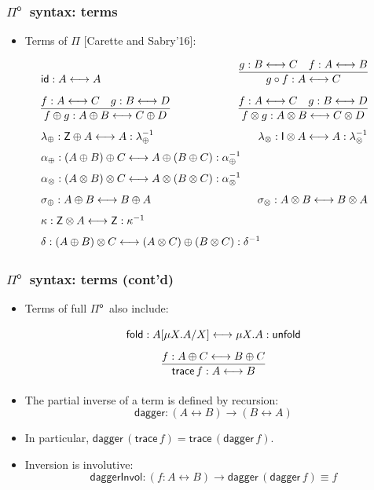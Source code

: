 \documentclass[12pt,t]{beamer}
\newcommand{\Pio}{\ensuremath{\mathsf{\Pi}^{\mathsf{o}}}}
\newcommand{\id}{\mathsf{id}}
\newcommand{\lr}{\longleftrightarrow}
\newcommand{\fold}{\mathsf{fold}}
\newcommand{\unfold}{\mathsf{unfold}}
\newcommand{\trace}{\ensuremath{\mathsf{trace}}}
\newcommand{\Z}{\mathsf{Z}}
\newcommand{\I}{\mathsf{I}}
\renewcommand{\dagger}{\mathsf{dagger}}
\begin{document}
\begin{frame}

  \frametitle{\Pio\ syntax: terms}
  \begin{itemize}
  \item Terms of $\Pi$ [Carette and Sabry'16]:

  \end{itemize}
  \small
  \[
  \arraycolsep=-10pt\def\arraystretch{1.6}
  \begin{array}{lr}%
    \id : A \lr A
    & \infer{g \circ f : A \lr C}{g : B \lr C & f : A \lr B} \\ [.25cm]
    \infer{f \oplus g : A \oplus B \lr C \oplus D}{f : A \lr C & g : B \lr D} 
    & \infer{f \otimes g : A \otimes B \lr C \otimes D}{f : A \lr C & g : B \lr D} \\
    \lambda_{\oplus} : \Z \oplus A \lr A : \lambda_{\oplus}^{-1}
    & \lambda_{\otimes} : \I \otimes A \lr A : \lambda_{\otimes}^{-1} \\
      \alpha_{\oplus} : (A \oplus B) \oplus C \lr A \oplus (B \oplus C) : \alpha_{\oplus}^{-1} \\
      \alpha_{\otimes} : (A \otimes B) \otimes C \lr A \otimes (B \otimes C) : \alpha_{\otimes}^{-1} \\
    \sigma_{\oplus} : A \oplus B \lr B \oplus A
    & \sigma_{\otimes} : A \otimes B \lr B \otimes A \\
    \kappa : \Z \otimes A \lr \Z : \kappa^{-1}  \\
     \delta : (A \oplus B) \otimes C \lr (A \otimes C) \oplus (B \otimes C) : \delta^{-1}
  \end{array}
  \]
\end{frame}
  
\begin{frame}

  \frametitle{\Pio\ syntax: terms (cont'd)}
  \begin{itemize}
  \item Terms of full \Pio\ also include:
    \[
    \def\arraystretch{1.6}  
    \begin{array}{c}
      \fold : A[\mu X.A/X] \lr \mu X.A : \unfold \\[.25cm]
      \infer{\trace \,f: A \lr B}{f : A \oplus C \lr B \oplus C}
    \end{array}
    \]
  \item The partial inverse of a term is defined by recursion:
    \[
    \dagger : (A \lr B) \to (B \lr A)
    \]
  \item In particular, $\dagger \,(\trace\,f) = \trace \,(\dagger \,f)$.
  \item Inversion is involutive:
    \[
    \mathsf{daggerInvol} : (f : A \lr B) \to \dagger \,(\dagger\,f) \equiv f
    \]
  \end{itemize}
\end{frame}
\end{document}
